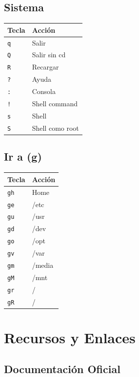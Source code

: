 \documentclass[
  doc,
  floatsintext,
  longtable,
  a4paper,
  nolmodern,
  notxfonts,
  notimes,
  12pt,
  colorlinks=true,linkcolor=blue,citecolor=blue,urlcolor=blue]{apa7}
\newcounter{none} %
\begin{document}
\subsection{Sistema}\label{sistema}

{\def\LTcaptype{none} %
\begin{longtable}[]{@{}ll@{}}
\toprule\noalign{}
Tecla & Acción \\
\midrule\noalign{}
\endhead
\bottomrule\noalign{}
\endlastfoot
\texttt{q} & Salir \\
\texttt{Q} & Salir sin cd \\
\texttt{R} & Recargar \\
\texttt{?} & Ayuda \\
\texttt{:} & Consola \\
\texttt{!} & Shell command \\
\texttt{s} & Shell \\
\texttt{S} & Shell como root \\
\end{longtable}
}

\subsection{Ir a (g)}\label{ir-a-g}

{\def\LTcaptype{none} %
\begin{longtable}[]{@{}ll@{}}
\toprule\noalign{}
Tecla & Acción \\
\midrule\noalign{}
\endhead
\bottomrule\noalign{}
\endlastfoot
\texttt{gh} & Home \\
\texttt{ge} & /etc \\
\texttt{gu} & /usr \\
\texttt{gd} & /dev \\
\texttt{go} & /opt \\
\texttt{gv} & /var \\
\texttt{gm} & /media \\
\texttt{gM} & /mnt \\
\texttt{gr} & / \\
\texttt{gR} & / \\
\end{longtable}
}

\section{Recursos y Enlaces}\label{recursos-y-enlaces}

\subsection{Documentación Oficial}\label{documentaciuxf3n-oficial}
\end{document}
